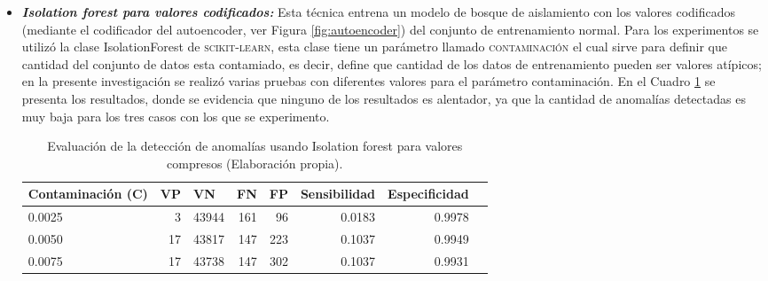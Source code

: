 \begin{itemize}
\item \textbf{\textit{Isolation forest para valores codificados: }}Esta t\'{e}cnica entrena un modelo de bosque de aislamiento con los valores codificados (mediante el codificador del autoencoder, ver Figura \ref{fig:autoencoder}) del conjunto de entrenamiento normal. Para los experimentos se utiliz\'{o} la clase IsolationForest de \textsc{scikit-learn}, esta clase tiene un par\'{a}metro llamado \textsc{contaminaci\'{o}n} el cual sirve para definir que cantidad del conjunto de datos esta contamiado, es decir, define que cantidad de los datos de entrenamiento pueden ser valores at\'{i}picos; en la presente investigaci\'{o}n se realiz\'{o} varias pruebas con diferentes valores para el par\'{a}metro contaminaci\'{o}n. En el Cuadro \ref{table:evaluacion_IF_encoded} se presenta los resultados, donde se evidencia que ninguno de los resultados es alentador, ya que la cantidad de anomal\'{i}as detectadas es muy baja para los tres casos con los que se experimento.

\begin{table}[H]
\centering
\begin{center}
\begin{tabular}{|l|r|r|r|r|r|r|r|}
\hline
\textbf{Contaminaci\'{o}n (C)} & \multicolumn{1}{l|}{\textbf{VP}} & \multicolumn{1}{l|}{\textbf{VN}}& \multicolumn{1}{l|}{\textbf{FN}}& \multicolumn{1}{l|}{\textbf{FP}} & \multicolumn{1}{l|}{\textbf{Sensibilidad}} & \multicolumn{1}{l|}{\textbf{Especificidad}} \\ \hline
0.0025 & \cellcolor[HTML]{AADD99} 3 & \cellcolor[HTML]{AADD99} 43944 & \cellcolor[HTML]{FFCE93} 161 & \cellcolor[HTML]{FFCE93} 96 & 0.0183 & 0.9978 \\ \hline
0.0050 & \cellcolor[HTML]{AADD99} 17 & \cellcolor[HTML]{AADD99} 43817 & \cellcolor[HTML]{FFCE93} 147 & \cellcolor[HTML]{FFCE93} 223 & 0.1037 & 0.9949 \\ \hline
0.0075 & \cellcolor[HTML]{AADD99} 17 & \cellcolor[HTML]{AADD99} 43738 & \cellcolor[HTML]{FFCE93} 147 & \cellcolor[HTML]{FFCE93} 302 & 0.1037 & 0.9931 \\ \hline
\end{tabular}
\end{center}
\caption{Evaluaci\'{o}n de la detecci\'{o}n de anomal\'{i}as usando Isolation forest para valores compresos (Elaboraci\'{o}n propia).}
\label{table:evaluacion_IF_encoded}
\end{table}


\end{itemize}
